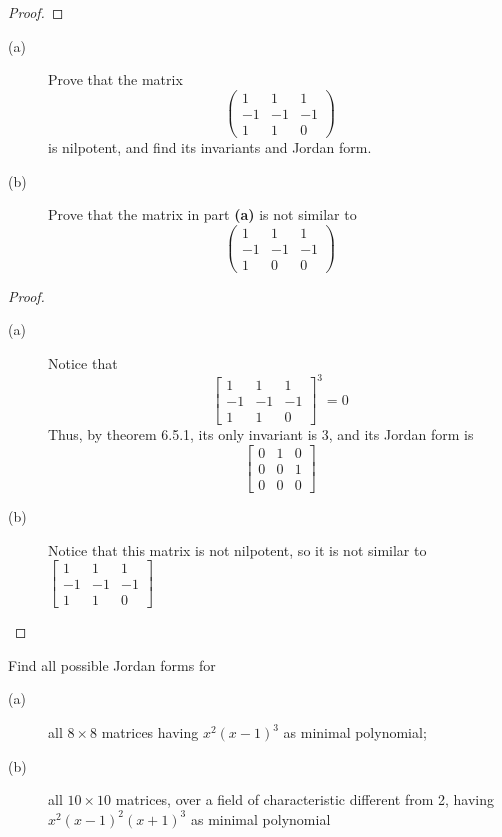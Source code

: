 \documentclass[12pt,leqno]{article}
\numberwithin{equation}{section}
\newcommand{\question}[2] {\vspace{.25in} \noindent\fbox{#1} #2 \vspace{.10in}}
\theoremstyle{definition}
\begin{document}
\begin{proof}
\end{proof}

\question{5}{}
\begin{description}
 \item [(a)] Prove that the matrix \[\begin{pmatrix}1&1&1\\-1&-1&-1\\1&1&0\end{pmatrix}\] is nilpotent, and find its invariants and Jordan form.
 \item [(b)] Prove that the matrix in part \textbf{(a)} is not similar to \[\begin{pmatrix}1&1&1\\-1&-1&-1\\1&0&0\end{pmatrix}\]
\end{description}

\begin{proof}
 \begin{description}
  \item [(a)]  Notice that \[\begin{bmatrix}1&1&1\\-1&-1&-1\\1&1&0\end{bmatrix}^3=0\] Thus, by theorem 6.5.1, its only invariant is 3, and its Jordan form is \[\begin{bmatrix}0&1&0\\0&0&1\\0&0&0\end{bmatrix}\]
  \item [(b)] Notice that this matrix is not nilpotent, so it is not similar to $\begin{bmatrix}1&1&1\\-1&-1&-1\\1&1&0\end{bmatrix}$
 \end{description}
\end{proof}

\question{12}{Find all possible Jordan forms for}
\begin{description}
 \item [(a)] all $8\times8$ matrices having $x^2(x-1)^3$ as minimal polynomial;
 \item [(b)] all $10\times10$ matrices, over a field of characteristic different from 2, having $x^2(x-1)^2(x+1)^3$ as minimal polynomial
\end{description}
\end{document}
